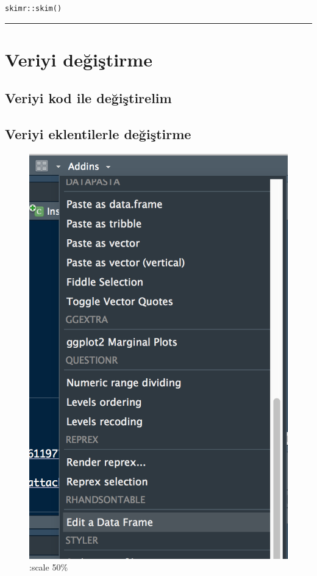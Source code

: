 \documentclass[]{article}
\begin{document}
\begin{verbatim}
skimr::skim()
\end{verbatim}

\begin{center}\rule{0.5\linewidth}{\linethickness}\end{center}

\hypertarget{veriyi-degistirme}{%
\section{Veriyi değiştirme}\label{veriyi-degistirme}}

\hypertarget{veriyi-kod-ile-degistirelim}{%
\subsection{Veriyi kod ile
değiştirelim}\label{veriyi-kod-ile-degistirelim}}

\hypertarget{veriyi-eklentilerle-degistirme}{%
\subsection{Veriyi eklentilerle
değiştirme}\label{veriyi-eklentilerle-degistirme}}

\begin{figure}
\centering
\includegraphics{figures/change_data.png}
\caption{:scale 50\%}
\end{figure}
\end{document}
